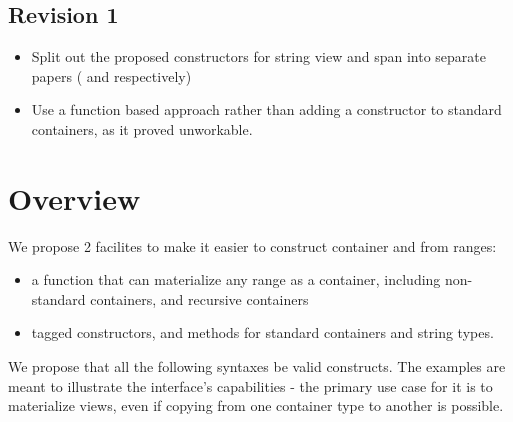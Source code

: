 \documentclass{wg21}
\begin{document}
\subsection*{Revision 1}
\begin{itemize}
    \item Split out the proposed constructors for string view and span into separate papers (\cite{P1391} and \cite{P1394} respectively)
    \item Use a function based approach rather than adding a constructor to standard containers, as it proved unworkable.
\end{itemize}


\section{Overview}

We propose 2 facilites to make it easier to construct container and from ranges:

\begin{itemize}
\item {} a function that can materialize any range as a container, including non-standard containers, and recursive containers
\item tagged constructors,  and  methods for standard containers and string types.
\end{itemize}


We propose that all the following syntaxes be valid constructs.
The examples are meant to illustrate the interface's capabilities - the primary use case for it is to materialize views, even if copying from one container type to another is possible.
\end{document}
